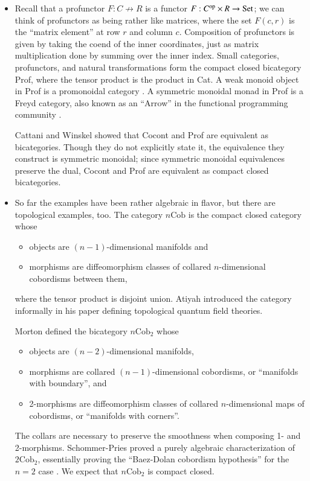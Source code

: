 \documentclass{article}
\newcommand{\Set}{\mathrm{Set}}
\newcommand{\op}{{\rm op}}
\newcommand{\nCob}{n\mbox{Cob}}
\begin{document}
\begin{itemize}
  \item Recall that a profunctor $F:C \not\to R$ is a functor $F:C^{\op} \times R \to \Set$; we can think of profunctors as being rather like matrices, where the set $F(c,r)$ is the ``matrix element'' at row $r$ and column $c$.  Composition of profunctors is given by taking the coend of the inner coordinates, just as matrix multiplication done by summing over the inner index.  Small categories, profunctors, and natural transformations form the compact closed bicategory Prof, where the tensor product is the product in Cat.  A weak monoid object in Prof is a promonoidal category \cite{Day, Houston}. A symmetric monoidal monad in Prof is a Freyd category, also known as an ``Arrow'' in the functional programming community \cite{Asada, JHH}.

    Cattani and Winskel \cite{CW04} showed that Cocont and Prof are equivalent as bicategories.  Though they do not explicitly state it, the equivalence they construct is symmetric monoidal; since symmetric monoidal equivalences preserve the dual, Cocont and Prof are equivalent as compact closed bicategories.
  \item So far the examples have been rather algebraic in flavor, but there are topological examples, too.  The category $\nCob$ is the compact closed category whose
    \begin{itemize}
      \item objects are $(n-1)$-dimensional manifolds and
      \item morphisms are diffeomorphism classes of collared $n$-dimensional cobordisms between them,
    \end{itemize}
    where the tensor product is disjoint union.  Atiyah \cite{AtiyahTQFT} introduced the category informally in his paper defining topological quantum field theories.

    Morton \cite{Morton} defined the bicategory $\nCob_2$ whose
    \begin{itemize}
      \item objects are $(n-2)$-dimensional manifolds,
      \item morphisms are collared $(n-1)$-dimensional cobordisms, or ``manifolds with boundary'', and
      \item 2-morphisms are diffeomorphism classes of collared $n$-dimensional maps of cobordisms, or ``manifolds with corners''.
    \end{itemize}
    The collars are necessary to preserve the smoothness when composing 1- and 2-morphisms.  Schommer-Pries proved a purely algebraic characterization of $2\mbox{Cob}_2$, essentially proving the ``Baez-Dolan cobordism hypothesis'' for the $n=2$ case \cite{HDATQFT}.  We expect that $\nCob_2$ is compact closed.
    

\end{itemize}
\end{document}
